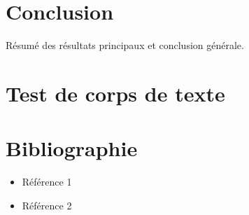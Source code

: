 \documentclass[a4paper,12pt]{article}
\begin{document}
\section{Conclusion}
Résumé des résultats principaux et conclusion générale.

\section{Test de corps de texte}
\lipsum[1-3] %

\section*{Bibliographie}
\begin{itemize}
	\item Référence 1
	\item Référence 2
\end{itemize}
\end{document}
